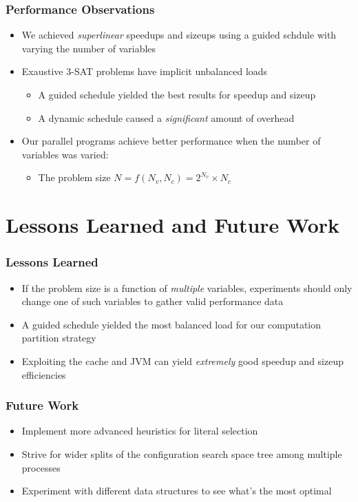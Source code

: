 \documentclass[handout,10pt]{beamer}
\begin{document}
\begin{frame}
	\frametitle{Performance Observations}
	\begin{itemize}
		\item We achieved \emph{superlinear} speedups and sizeups using a guided schdule with varying the number of variables
		\item Exaustive 3-SAT problems have implicit unbalanced loads
		\begin{itemize}
			\item A guided schedule yielded the best results for speedup and sizeup
			\item A dynamic schedule caused a \emph{significant} amount of overhead
		\end{itemize}
		\item Our parallel programs achieve better performance when the number of variables was varied:
		\begin{itemize}
			\item The problem size $N = f(N_v, N_c) = 2^{N_v} \times N_c$
		\end{itemize}
	\end{itemize}
\end{frame}

\section{Lessons Learned and Future Work}
\begin{frame}
	\frametitle{Lessons Learned}
	\begin{itemize}
		\item If the problem size is a function of \emph{multiple} variables, experiments should only change one 
		of such variables to gather valid performance data
		\item A guided schedule yielded the most balanced load for our computation partition strategy
		\item Exploiting the cache and JVM can yield \emph{extremely} good speedup and sizeup efficiencies
	\end{itemize}
\end{frame}

\begin{frame}
	\frametitle{Future Work}
	\begin{itemize}
		\item Implement more advanced heuristics for literal selection
		\item Strive for wider splits of the configuration search space tree among multiple processes 
		\item Experiment with different data structures to see what's the most optimal
	\end{itemize}
\end{frame}
\end{document}
